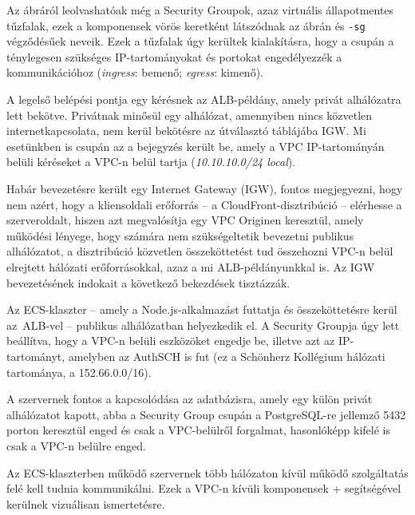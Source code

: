 Az ábráról leolvashatóak még a Security Groupok, azaz virtuális állapotmentes tűzfalak, ezek a komponensek vörös keretként látszódnak az ábrán és \verb|-sg| végződésűek neveik. Ezek a tűzfalak úgy kerültek kialakításra, hogy a csupán a ténylegesen szükséges IP-tartományokat és portokat engedélyezzék a kommunikációhoz (\emph{ingress}: bemenő; \emph{egress}: kimenő).

A legelső belépési pontja egy kérésnek az ALB-példány, amely privát alhálózatra lett bekötve. Privátnak minősül egy alhálózat, amennyiben nincs közvetlen internetkapcsolata, nem kerül bekötésre az útválasztó táblájába IGW. Mi esetünkben is csupán az a bejegyzés került be, amely a VPC IP-tartományán belüli kéréseket a VPC-n belül tartja (\emph{10.10.10.0/24 local}).

Habár bevezetésre került egy Internet Gateway (IGW), fontos megjegyezni, hogy nem azért, hogy a kliensoldali erőforrás -- a CloudFront-disztribúció -- elérhesse a szerveroldalt, hiszen azt megvalósítja egy VPC Originen keresztül, amely működési lényege, hogy számára nem szükségeltetik bevezetni publikus alhálózatot, a disztribúció közvetlen összeköttetést tud összehozni VPC-n belül elrejtett hálózati erőforrásokkal, azaz a mi ALB-példányunkkal is\cite{vpcorigin}. Az IGW bevezetésének indokait a következő bekezdések tisztázzák.

Az ECS-klaszter -- amely a Node.js-alkalmazást futtatja és összeköttetésre kerül az~ALB-vel -- publikus alhálózatban helyezkedik el. A Security Groupja úgy lett beállítva, hogy a VPC-n belüli eszközöket engedje be, illetve azt az IP-tartományt, amelyben az AuthSCH is fut (ez a Schönherz Kollégium hálózati tartománya, a 152.66.0.0/16).

A szervernek fontos a kapcsolódása az adatbázisra, amely egy külön privát alhálózatot kapott, abba a Security Group csupán a PostgreSQL-re jellemző 5432 porton keresztül enged és csak a VPC-belülről forgalmat, hasonlóképp kifelé is csak a VPC-n belülre enged.

Az ECS-klaszterben működő szervernek több hálózaton kívül működő szolgáltatás felé kell tudnia kommunikálni. Ezek a VPC-n kívüli komponensek \az+ segítségével kerülnek vizuálisan ismertetésre.

